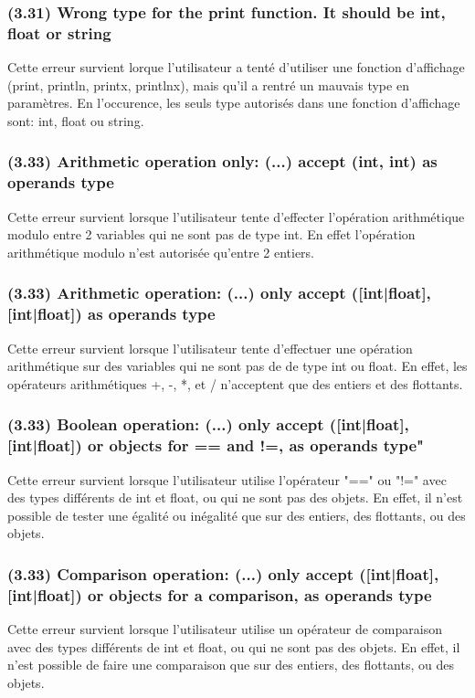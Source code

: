 \documentclass[12pt, a4paper, one side]{article}
\begin{document}
\subsubsection{(3.31) Wrong type for the print function. It should be int, float or string}
Cette erreur survient lorque l'utilisateur a tenté d'utiliser une fonction d'affichage (print, println, printx, printlnx),
mais qu'il a rentré un mauvais type en paramètres. En l'occurence, les seuls type autorisés dans une
fonction d'affichage sont: int, float ou string.

\subsubsection{(3.33) Arithmetic operation only: (...) accept (int, int) as operands type}
Cette erreur survient lorsque l'utilisateur tente d'effecter l'opération arithmétique modulo entre 2 variables qui ne sont pas de type int. En effet l'opération arithmétique modulo n'est autorisée qu'entre 2 entiers.

\subsubsection{(3.33) Arithmetic operation: (...) only accept ([int|float], [int|float]) as operands type}
Cette erreur survient lorsque l'utilisateur tente d'effectuer une opération arithmétique sur des variables qui ne sont pas de de type int ou float. En effet, les opérateurs arithmétiques +, -, *, et / n'acceptent que des entiers et des flottants.

\subsubsection{(3.33) Boolean operation: (...) only accept ([int|float], [int|float]) or objects for == and !=, as operands type"}
Cette erreur survient lorsque l'utilisateur utilise l'opérateur "==" ou "!=" avec des types différents de int et float, ou qui ne sont pas des objets. En effet, il n'est possible de tester une égalité ou inégalité que sur des entiers, des flottants, ou des objets.

\subsubsection{(3.33) Comparison operation: (...) only accept ([int|float], [int|float]) or objects for a comparison, as operands type}
Cette erreur survient lorsque l'utilisateur utilise un opérateur de comparaison avec des types différents de int et float, ou qui ne sont pas des objets. En effet, il n'est possible de faire une comparaison que sur des entiers, des flottants, ou des objets.
\end{document}
